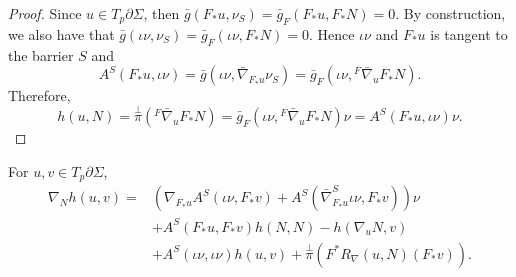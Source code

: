 \begin{proof}
    Since $u \in T_p \partial \Sigma$, then $\bar{g}(F_* u, \nu _S)=\bar{g}_F(F_* u, F_* N)=0$. By construction, we also have that $\bar{g}(\iota \nu , \nu _S)=\bar{g}_F(\iota \nu , F_* N)=0$. Hence $\iota \nu $ and $F_*u$ is tangent to the barrier $S$ and 
    \[A^S(F_{*}u, \iota \nu )=\bar{g}(\iota \nu , \bar{\nabla }_{F_*u}\nu _S)=\bar{g}_F(\iota \nu ,{}^F \bar{\nabla } _u F_* N).\]
    Therefore,
    \[h(u,N)=\overset{\perp }{\pi} ({}^F \bar{\nabla } _u F_* N)= \bar{g}_F(\iota \nu ,{}^F \bar{\nabla } _u F_* N) \nu = A^S(F_{*}u, \iota \nu ) \nu .\] 
\end{proof}

\begin{theorem}
    For $u,v \in T_p \partial \Sigma $, 
    \begin{equation*}
        \begin{split}
            \nabla _N h(u,v)
            =& \left( \nabla _{F_*u}A^S(\iota \nu , F_*v)+A^S(\bar{\nabla }^{S}_{F_*u} \iota \nu , F_*v)  \right)   \nu \\
            & +A^S(F_*u, F_* v)h(N,N)-h(\nabla_u N, v) \\
            & + A^S(\iota  \nu  , \iota \nu )h(u,v) +\overset{\perp }{\pi} (F^*R_{\nabla }(u,N)(F_* v)).
    \end{split}
    \end{equation*}    
\end{theorem}

